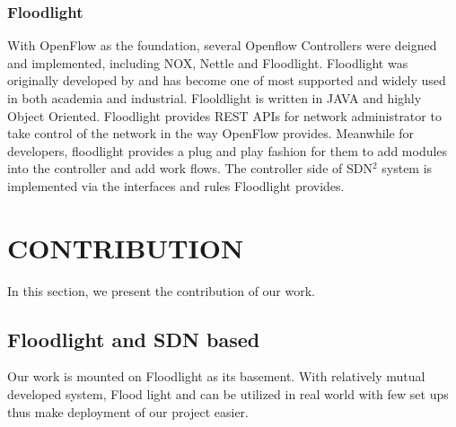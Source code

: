 \documentclass[a4paper,11pt,twocolumn]{article}
\begin{document}
\subsubsection{Floodlight}
With OpenFlow as the foundation, several Openflow Controllers were deigned and implemented, including NOX, Nettle and Floodlight. Floodlight was originally developed by and has become one of most supported and widely used in both academia and industrial. Flooldlight is written in JAVA and highly Object Oriented.
Floodlight provides REST APIs for network administrator to take control of the network in the way OpenFlow provides. Meanwhile for developers, floodlight provides a plug and play fashion for them to 
add modules into the controller and add work flows. The controller side of SDN$^{2}$ system is implemented via the interfaces and rules Floodlight provides.


\section{CONTRIBUTION}
In this section, we present the contribution of our work.
\subsection{Floodlight and SDN based}
Our work is mounted on Floodlight as its basement. With relatively mutual developed system, Flood light and
  can be utilized in real world with few set ups thus make deployment of our project easier.


\end{document}
